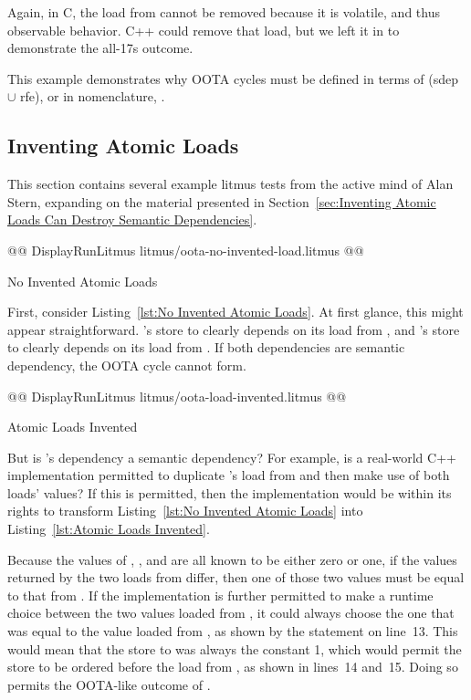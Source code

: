 \documentclass[10]{article}
\begin{document}
Again, in C, the load from  cannot be removed because it is
volatile, and thus observable behavior.
C++ could remove that load, but we left it in to demonstrate the all-17s
outcome.

This example demonstrates why OOTA cycles must be defined in terms
of (sdep $\cup$ rfe), or in  nomenclature,
.

\subsection{Inventing Atomic Loads}
\label{app:Inventing Atomic Loads}

This section contains several example litmus tests from the active
mind of Alan Stern, expanding on the material presented in
Section~\ref{sec:Inventing Atomic Loads Can Destroy Semantic Dependencies}.

\begin{listing}[tbp]
@@ DisplayRunLitmus litmus/oota-no-invented-load.litmus @@
\caption{No Invented Atomic Loads}
\label{lst:No Invented Atomic Loads}
\end{listing}

First, consider Listing~\ref{lst:No Invented Atomic Loads}.
At first glance, this might appear straightforward.
's store to  clearly depends on its load from ,
and 's store to  clearly depends on its load from .
If both dependencies are semantic dependency, the OOTA cycle cannot
form.

\begin{listing}[tbp]
@@ DisplayRunLitmus litmus/oota-load-invented.litmus @@
\caption{Atomic Loads Invented}
\label{lst:Atomic Loads Invented}
\end{listing}

But is 's dependency a semantic dependency?
For example, is a real-world C++ implementation permitted to
duplicate 's load from  and then make use of both loads'
values?
If this is permitted, then the implementation would be within its rights
to transform
Listing~\ref{lst:No Invented Atomic Loads}
into
Listing~\ref{lst:Atomic Loads Invented}.

Because the values of , , and  are all known to be
either zero or one, if the values returned by the two loads from 
differ, then one of those two values must be equal to that from .
If the implementation is further permitted to make a runtime choice
between the two values loaded from , it could always choose the
one that was equal to the value loaded from , as shown by the
 statement on line~13.
This would mean that the store to  was always the constant 1,
which would permit the store to be ordered before the load from ,
as shown in lines~14 and~15.
Doing so permits the OOTA-like outcome of .
\end{document}
